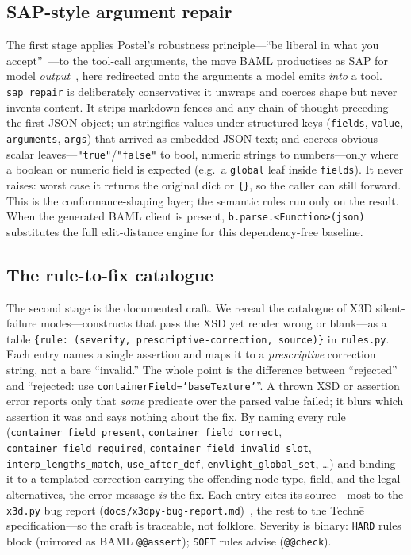 \documentclass[sigconf,nonacm,screen,anonymous]{acmart}
\begin{document}
\subsection{SAP-style argument repair}
The first stage applies Postel's robustness principle---``be liberal in what you accept''~\cite{postel}---to the tool-call arguments, the move BAML productises as SAP for model \emph{output}~\cite{baml}, here redirected onto the arguments a model emits \emph{into} a tool. \texttt{sap\_repair} is deliberately conservative: it unwraps and coerces shape but never invents content. It strips markdown fences and any chain-of-thought preceding the first JSON object; un-stringifies values under structured keys (\texttt{fields}, \texttt{value}, \texttt{arguments}, \texttt{args}) that arrived as embedded JSON text; and coerces obvious scalar leaves---\texttt{"true"}/\texttt{"false"} to bool, numeric strings to numbers---only where a boolean or numeric field is expected (e.g.\ a \texttt{global} leaf inside \texttt{fields}). It never raises: worst case it returns the original dict or \texttt{\{\}}, so the caller can still forward. This is the conformance-shaping layer; the semantic rules run only on the result. When the generated BAML client is present, \texttt{b.parse.<Function>(json)} substitutes the full edit-distance engine for this dependency-free baseline.

\subsection{The rule-to-fix catalogue}
The second stage is the documented craft. We reread the catalogue of X3D silent-failure modes---constructs that pass the XSD yet render wrong or blank---as a table \texttt{\{rule: (severity, prescriptive-correction, source)\}} in \texttt{rules.py}. Each entry names a single assertion and maps it to a \emph{prescriptive} correction string, not a bare ``invalid.'' The whole point is the difference between ``rejected'' and ``rejected: use \texttt{containerField='baseTexture'}''. A thrown XSD or assertion error reports only that \emph{some} predicate over the parsed value failed; it blurs which assertion it was and says nothing about the fix. By naming every rule (\texttt{container\_field\_present}, \texttt{container\_field\_correct}, \texttt{container\_field\_required}, \texttt{container\_field\_invalid\_slot}, \texttt{interp\_lengths\_match}, \texttt{use\_after\_def}, \texttt{envlight\_global\_set}, \ldots) and binding it to a templated correction carrying the offending node type, field, and the legal alternatives, the error message \emph{is} the fix. Each entry cites its source---most to the \texttt{x3d.py} bug report (\texttt{docs/x3dpy-bug-report.md})~\cite{x3dpy}, the rest to the Technē specification---so the craft is traceable, not folklore. Severity is binary: \texttt{HARD} rules block (mirrored as BAML \texttt{@@assert}); \texttt{SOFT} rules advise (\texttt{@@check}).
\end{document}
